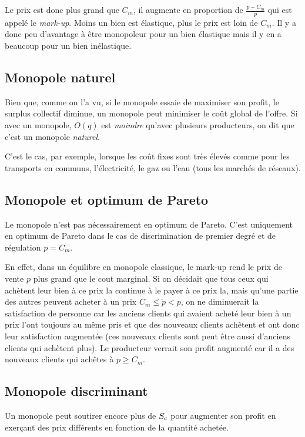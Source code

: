 Le prix est donc plus grand que $C_m$, il augmente en proportion de
$\frac{p-C_m}{p}$ qui est appelé le \emph{mark-up}.
Moins un bien est élastique, plus le prix est loin de $C_m$.
Il y a donc peu d'avantage à être monopoleur pour un bien élastique
mais il y en a beaucoup pour un bien inélastique.

\subsection{Monopole naturel}
Bien que, comme on l'a vu, si le monopole essaie de maximiser
son profit, le surplus collectif diminue,
un monopole peut minimiser le coût global de l'offre.
Si avec un monopole, $O(q)$ est \emph{moindre} qu'avec plusieurs producteurs,
on dit que c'est un monopole \emph{naturel}.

C'est le cas, par exemple, lorsque les coût fixes sont très élevés comme
pour les transports en communs, l'électricité, le gaz ou l'eau
(tous les marchés de réseaux).

\subsection{Monopole et optimum de Pareto}
\label{ref:monopareto}
Le monopole n'est pas nécessairement en optimum de Pareto.
C'est uniquement en optimum de Pareto dans le cas de discrimination
de premier degré et de régulation $p = C_m$.

En effet,
dans un équilibre en monopole classique,
le mark-up rend le prix de vente $p$ plus grand que le cout marginal.
Si on décidait que tous ceux qui achètent leur bien à ce prix
la continue à le payer à ce prix la,
mais qu'une partie des autres peuvent acheter à un prix
$C_m \leq \tilde{p} < p$,
on ne diminuerait la satisfaction de personne car
les anciens clients qui avaient acheté leur bien à un prix l'ont toujours
au même pris et que des nouveaux clients achêtent et ont donc
leur satisfaction augmentée
(ces nouveaux clients sont peut être aussi
d'anciens clients qui achètent plus).
Le producteur verrait son profit augmenté car il a des nouveaux clients
qui achêtes à $p \geq C_m$.

\subsection{Monopole discriminant}
Un monopole peut soutirer encore plus de ${S_c}$ pour augmenter
son profit en exerçant des prix différents en fonction de la quantité
achetée.

